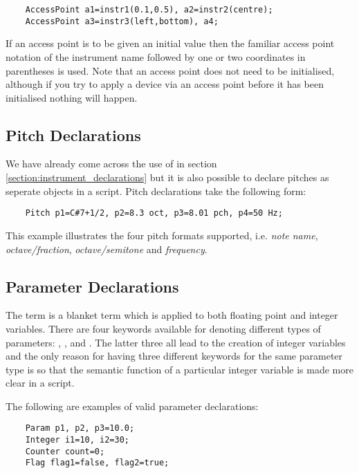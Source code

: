 \begin{verbatim}
    AccessPoint a1=instr1(0.1,0.5), a2=instr2(centre);
    AccessPoint a3=instr3(left,bottom), a4;
\end{verbatim}

If an access point is to be given an initial value then the familiar
access point notation of the instrument name followed by one or two
coordinates in parentheses is used. Note that an access point does
not need to be initialised, although if you try to apply a device via
an access point before it has been initialised nothing will happen.

\subsection{Pitch Declarations}
\label{section:pitch_declarations}
We have already come across the use of  in
section \ref{section:instrument_declarations} but it is also possible
to declare pitches as seperate objects in a script. Pitch declarations
take the following form:

\begin{verbatim}
    Pitch p1=C#7+1/2, p2=8.3 oct, p3=8.01 pch, p4=50 Hz;
\end{verbatim}

This example illustrates the four pitch formats supported, i.e.
\emph{note name}, \emph{octave/fraction}, \emph{octave/semitone} and 
\emph{frequency}.

\subsection{Parameter Declarations}
\label{section:parameter_declarations}
The term  is a blanket term which is applied to both
floating point and integer variables. There are four keywords available
for denoting different types of parameters: , ,
 and . The latter three all lead to the creation
of integer variables and the only reason for having three different keywords
for the same parameter type is so that the semantic function of a 
particular integer variable is made more clear in a script.

The following are examples of valid parameter declarations:

\begin{verbatim}
    Param p1, p2, p3=10.0;
    Integer i1=10, i2=30;
    Counter count=0;
    Flag flag1=false, flag2=true;
\end{verbatim}


